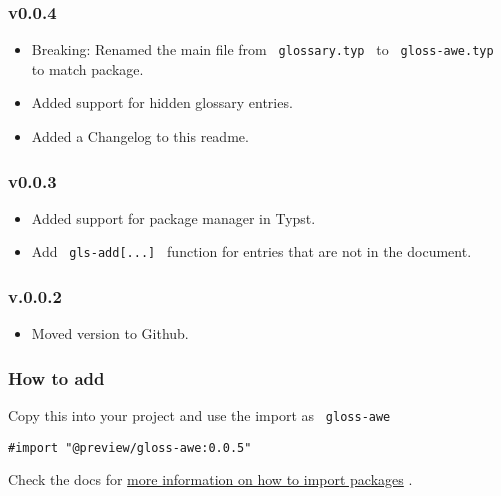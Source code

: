 \subsubsection{v0.0.4}\label{v0.0.4}

\begin{itemize}
\tightlist
\item
  Breaking: Renamed the main file from \texttt{\ glossary.typ\ } to
  \texttt{\ gloss-awe.typ\ } to match package.
\item
  Added support for hidden glossary entries.
\item
  Added a Changelog to this readme.
\end{itemize}

\subsubsection{v0.0.3}\label{v0.0.3}

\begin{itemize}
\tightlist
\item
  Added support for package manager in Typst.
\item
  Add \texttt{\ gls-add{[}...{]}\ } function for entries that are not in
  the document.
\end{itemize}

\subsubsection{v.0.0.2}\label{v.0.0.2}

\begin{itemize}
\tightlist
\item
  Moved version to Github.
\end{itemize}

\subsubsection{How to add}\label{how-to-add}

Copy this into your project and use the import as \texttt{\ gloss-awe\ }

\begin{verbatim}
#import "@preview/gloss-awe:0.0.5"
\end{verbatim}



Check the docs for
\href{https://typst.app/docs/reference/scripting/\#packages}{more
information on how to import packages} .

